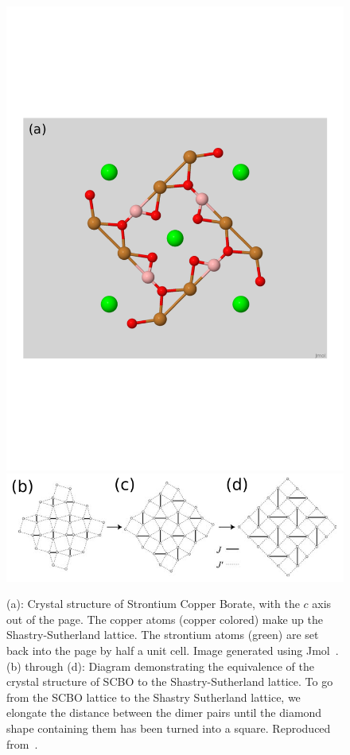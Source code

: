 \documentclass{thesis-umich}
\begin{document}
\begin{figure}
	\caption[Crystal Structure of Strontium Copper Borate]{(a): Crystal structure of Strontium Copper Borate, with the $c$ axis out of the page. The copper atoms (copper colored) make up the Shastry-Sutherland lattice. The strontium atoms (green) are set back into the page by half a unit cell. Image generated using Jmol~\cite{jmol}. (b) through (d): Diagram demonstrating the equivalence of the crystal structure of SCBO to the Shastry-Sutherland lattice. To go from the SCBO lattice to the Shastry Sutherland lattice, we elongate the distance between the dimer pairs until the diamond shape containing them has been turned into a square. Reproduced from~\cite{Kageyama2005}.}
	\label{fig:scbo_crystal}
	\includegraphics[width=\columnwidth,trim={0 2.5in 0 2.5in},clip]{figures/scbo.pdf}
	\includegraphics[width=\columnwidth]{figures/scbo_to_ss_kageyama.pdf}
\end{figure}
\end{document}
